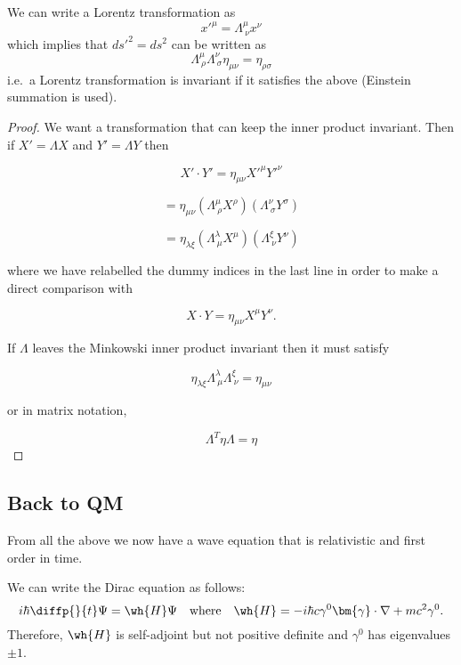 \documentclass[12pt, a4paper]{article}
\begin{document}
\begin{mdthm}
    We can write a Lorentz transformation as 
    \[x'^{\mu} = \Lambda^{\mu}_{\ \nu} x^{\nu}\]
    which implies that \(ds'^2 =ds^2\) can be written as 
    \[\Lambda^{\mu}_{\ \rho} \Lambda^{\nu}_{\ \sigma} \eta_{\mu\nu} = \eta_{\rho\sigma}
    \]
    i.e.\ a Lorentz transformation is invariant if it satisfies the above (Einstein summation is used).
\end{mdthm}

\begin{proof}
    We want a transformation that can keep the inner product invariant. Then if \( X' = \Lambda X \) and \( Y' = \Lambda Y \) then

\[
X' \cdot Y' = \eta_{\mu\nu}X'^{\mu}Y'^{\nu}
\]

\[
= \eta_{\mu\nu}(\Lambda^{\mu}_{\ \rho}X^{\rho})(\Lambda^{\nu}_{\ \sigma}Y^{\sigma})
\]

\[
= \eta_{\lambda\xi}(\Lambda^{\lambda}_{\ \mu}X^{\mu})(\Lambda^{\xi}_{\ \nu}Y^{\nu})
\]

where we have relabelled the dummy indices in the last line in order to make a direct comparison with

\[
X \cdot Y = \eta_{\mu\nu}X^{\mu}Y^{\nu}.
\]

If \(\Lambda\) leaves the Minkowski inner product invariant then it must satisfy

\[
\eta_{\lambda\xi}\Lambda^{\lambda}_{\ \mu}\Lambda^{\xi}_{\ \nu} = \eta_{\mu\nu}
\]

or in matrix notation,

\[
\Lambda^T \eta \Lambda = \eta
\]

\end{proof}

\subsection{Back to QM}

From all the above we now have a wave equation that is relativistic and first order in time.

\begin{proposition}
    We can write the Dirac equation as follows:
    \[i\hbar \diffp{}{t}\Psi = \wh{H}\Psi \quad \text{where} \quad \wh{H} = -i\hbar c\gamma^0\bm{\gamma}\cdot \nabla +mc^2\gamma^0.\]
    Therefore, \(\wh{H}\) is self-adjoint but not positive definite and \(\gamma^0\) has eigenvalues \(\pm 1\).
\end{proposition}
\end{document}
